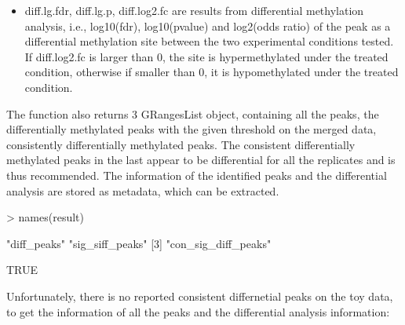 \documentclass[]{article}
\begin{document}
{\begin{itemize}
  \item diff.lg.fdr, diff.lg.p, diff.log2.fc are results from differential methylation analysis, i.e., log10(fdr),  log10(pvalue) and log2(odds ratio) of the peak as a differential methylation site between the two experimental conditions tested. If diff.log2.fc is larger than 0, the site is hypermethylated under the treated condition, otherwise if smaller than 0, it is hypomethylated under the treated condition.   
\end{itemize}

The function also returns 3 GRangesList object, containing all the peaks, the differentially methylated peaks with the given threshold on the merged data, consistently differentially methylated peaks. The consistent differentially methylated peaks in the last appear to be differential for all the replicates and is thus recommended. The information of the identified peaks and the differential analysis are stored as metadata, which can be extracted. 

\begin{Schunk}
\begin{Sinput}
> names(result)
\end{Sinput}
\begin{Soutput}
[1] "diff_peaks"         "sig_siff_peaks"    
[3] "con_sig_diff_peaks"
\end{Soutput}
\begin{Soutput}
[1] TRUE
\end{Soutput}
\end{Schunk}

Unfortunately, there is no reported consistent differnetial peaks on the toy data, to get the information of all the peaks and the differential analysis information:

}
\end{document}
